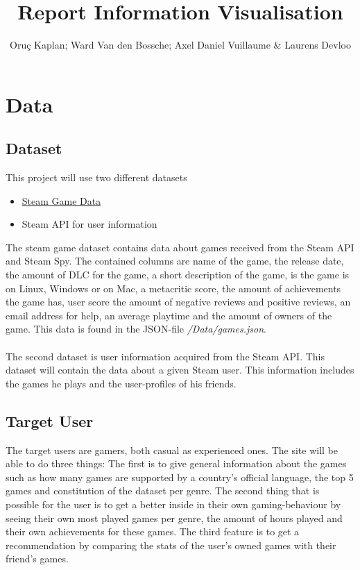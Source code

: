 \documentclass{article}
\begin{document}
	\title{Report Information Visualisation}
	\author{Oruç Kaplan; Ward Van den Bossche; Axel Daniel Vuillaume \& Laurens Devloo}
	\maketitle
	\tableofcontents
	\newpage
	
	\section{Data}
	
	\subsection{Dataset}
	
	This project will use two different datasets
	
	\begin{itemize}
		\item \href{https://www.kaggle.com/datasets/fronkongames/steam-games-dataset/code}{Steam Game Data}
		\item Steam API for user information
	\end{itemize}
	
	The steam game dataset contains data about games received from the Steam API and Steam Spy. The contained columns are name of the game, the release date, the amount of DLC for the game, a short description of the game, is the game is on Linux, Windows or on Mac, a metacritic score, the amount of achievements the game has, user score the amount of negative reviews and positive reviews, an email address for help, an average playtime and the amount of owners of the game. This data is found in the JSON-file \textit{/Data/games.json}.\\
	\\
	The second dataset is user information acquired from the Steam API. This dataset will contain the data about a given Steam user. This information includes the games he plays and the user-profiles of his friends.
	
	\subsection{Target User}
	
	The target users are gamers, both casual as experienced ones. The site will be able to do three things: The first is to give general information about the games such as how many games are supported by a country's official language, the top 5 games and constitution of the dataset per genre. The second thing that is possible for the user is to get a better inside in their own gaming-behaviour by seeing their own most played games per genre, the amount of hours played and their own achievements for these games. The third feature is to get a recommendation by comparing the stats of the user's owned games with their friend's games.
	
\end{document}
